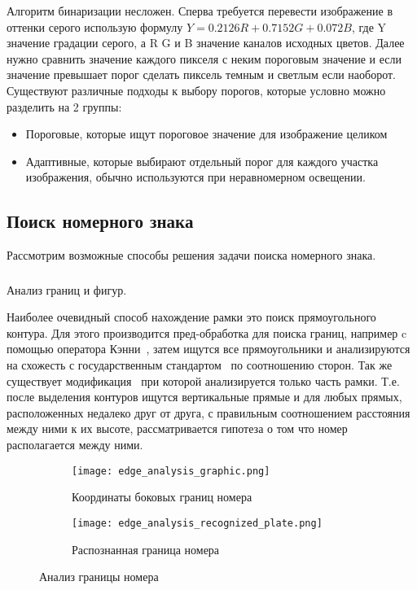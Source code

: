 Алгоритм бинаризации несложен. Сперва требуется перевести изображение в оттенки серого использую формулу $ Y = 0.2126R + 0.7152G + 0.072B $, где Y значение градации серого, а R G и B значение каналов исходных цветов. Далее нужно сравнить значение каждого пикселя с неким пороговым значение и если значение превышает порог сделать пиксель темным и светлым если наоборот. 
Существуют различные подходы к выбору порогов, которые условно можно разделить на 2 группы:
\begin{itemize}
  \item Пороговые, которые ищут пороговое значение для изображение целиком
  \item Адаптивные, которые выбирают отдельный порог для каждого участка изображения, обычно используются при неравномерном освещении.
\end{itemize}


\subsection{Поиск номерного знака}
\label{sub:domain:search}
Рассмотрим возможные способы решения задачи поиска номерного знака.
\subsubsection{}
\label{sub:domain:search:edges_analisys}
Анализ границ и фигур.

Наиболее очевидный способ нахождение рамки это поиск прямоугольного контура. Для этого производится пред-обработка для поиска границ, например c помощью оператора Кэнни~\cite{canny_edge_detector}, затем ищутся все прямоугольники и анализируются на схожесть с государственным стандартом~\cite{stb_914_99} по соотношению сторон. Так же существует модификация~\cite{recognition_using_hought} при которой анализируется только часть рамки. Т.е. после выделения контуров ищутся вертикальные прямые и для любых прямых, расположенных недалеко друг от друга, с правильным соотношением расстояния между ними к их высоте, рассматривается гипотеза о том что номер располагается между ними. 


\begin{figure}[ht]
\centering
  \begin{subfigure}[b]{0.48\textwidth} 
    \centering
    \texttt{[image: edge\_analysis\_graphic.png]}  
    \caption{Координаты боковых границ номера}
  \end{subfigure}
  \begin{subfigure}[b]{0.48\textwidth} 
    \centering
    \texttt{[image: edge\_analysis\_recognized\_plate.png]}  
    \caption{Распознанная граница номера}
  \end{subfigure}
  \caption{Анализ границы номера}
  \label{fig:domain:search:edges_analisys:edge_graphic}
\end{figure}

